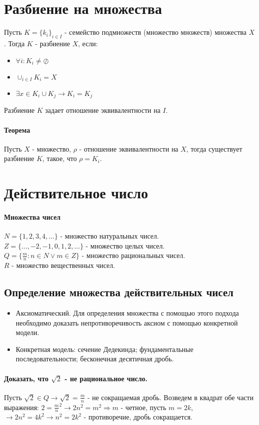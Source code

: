 \documentclass[10pt]{article}
\begin{document}
	\section{Разбиение на множества}
		Пусть $K = \{ k_{i} \}_{ i \in I }$ - семейство подмножеств (множество множеств) множества $X$. Тогда $K$ - разбиение $X$, если: 
		\begin{itemize}
			\item $\forall i : K_i \ne \oslash$
			\item $\cup_{i \in I} K_i = X$
			\item $\exists x \in K_i \cup K_j \to K_i = K_j$
		\end{itemize}
		Разбиение $K$ задает отношение эквивалентности на $I$.
		
		\paragraph{Теорема} Пусть $X$ - множество, $\rho$ - отношение эквивалентности на $X$, тогда существует разбиение 
		$K$, такое, что $\rho = K_i$.

	\section{Действительное число}
			\paragraph{Множества чисел}
			$N = \{1, 2, 3, 4, \dots\}$ - множество натуральных чисел. \\
			$Z = \{\dots, -2, -1, 0, 1, 2, \dots\}$ - множество целых чисел.\\
			$Q = \{\frac{m}{n} : n \in N \vee m \in Z\}$ - множество рациональных чисел.\\
			$R$ - множество вещественных чисел.
		\subsection{Определение множества действительных чисел}
			\begin{itemize}
				\item Аксиоматический. Для определения множества с помощью этого подхода необходимо доказать непротиворечивость аксиом с помощью конкретной модели.
				\item Конкретная модель: сечение Дедекинда; фундаментальные последовательности; бесконечная десятичная дробь. 
			\end{itemize}
			\paragraph{Доказать, что $\sqrt{2}$ - не рациональное число.}
			Пусть $\sqrt{2} \in Q \to \sqrt{2} = \frac{m}{n}$ - не сокращаемая дробь. Возведем в квадрат обе части выражения: $2 = \frac{m}{n}^2 \to 2n^2 = m^2 \Rightarrow m$ - четное, пусть $m = 2k$, $\to 2n^2 = 4k^2 \to n^2 = 2k^2$ - противоречие, дробь сокращается.
\end{document}
